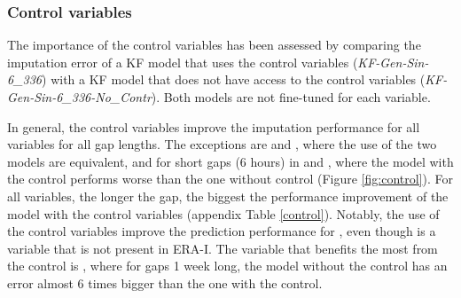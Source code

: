 \documentclass{article}
\begin{document}
\subsubsection{Control variables}

The importance of the control variables has been assessed by comparing the imputation error of a KF model that uses the control variables (\textit{KF-Gen-Sin-6\_336}) with a KF model that does not have access to the control variables (\textit{KF-Gen-Sin-6\_336-No\_Contr}). Both models are not fine-tuned for each variable.

In general, the control variables improve the imputation performance for all variables for all gap lengths. The exceptions are  and , where the use of the two models are equivalent, and for short gaps (6 hours) in  and , where the model with the control performs worse than the one without control (Figure \ref{fig:control}).
For all variables, the longer the gap, the biggest the performance improvement of the model with the control variables (appendix Table \ref{control}). Notably, the use of the control variables improve the prediction performance for , even though is a variable that is not present in ERA-I.
The variable that benefits the most from the control is , where for gaps 1 week long, the model without the control has an error almost 6 times bigger than the one with the control.



\end{document}
